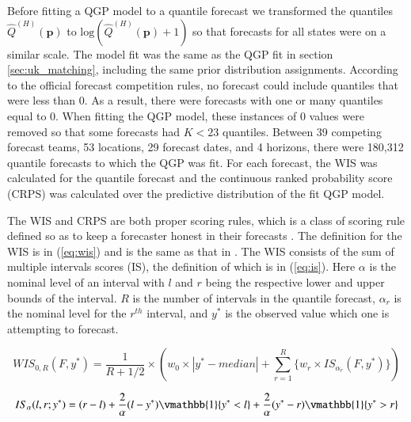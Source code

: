 \documentclass[preprint,12pt,authoryear]{elsarticle}
\begin{document}
Before fitting a QGP model to a quantile forecast we transformed the quantiles $\hat{Q}^{(H)}(\boldsymbol{p})$ to $\text{log}(\hat{Q}^{(H)}(\boldsymbol{p}) + 1)$ so that forecasts for all states were on a similar scale. The model fit was the same as the QGP fit in section \ref{sec:uk_matching}, including the same prior distribution assignments.
According to the official forecast competition rules, no forecast could include quantiles that were less than 0. As a result, there were forecasts with one or many quantiles equal to 0. When fitting the QGP model, these instances of 0 values were removed so that some forecasts had $K < 23$ quantiles. Between 39 competing forecast teams, 53 locations, 29 forecast dates, and 4 horizons, there were 180,312 quantile forecasts to which the QGP was fit. For each forecast, the WIS was calculated for the quantile forecast and the continuous ranked probability score (CRPS) was calculated over the predictive distribution of the fit QGP model.

The WIS and CRPS are both proper scoring rules, which is a class of scoring rule defined so as to keep a forecaster honest in their forecasts \cite[]{gneiting2007strictly, gneiting2014probabilistic}. 
The definition for the WIS is in (\ref{eq:wis}) and is the same as that in \cite{bracher2021evaluating}. The WIS consists of the sum of multiple intervals scores (IS), the definition of which is in (\ref{eq:is}). Here $\alpha$ is the nominal level of an interval with $l$ and $r$ being the respective lower and upper bounds of the interval. $R$ is the number of intervals in the quantile forecast, $\alpha_r$ is the nominal level for the $r^{th}$ interval, and $y^*$ is the observed value which one is attempting to forecast. 

\begin{equation}
\label{eq:wis}
        WIS_{0,R}(F, y^*) = \frac{1}{R + 1/2} \times (w_0\times |y^* - median| + \sum_{r=1}^R \{w_r \times IS_{\alpha_r}(F, y^*) \} )
\end{equation}

\begin{equation}
\label{eq:is}
        IS_{\alpha}(l,r;y^*) = (r-l) + \frac{2}{\alpha}(l - y^*)\vmathbb{1}\{y^* < l\} + \frac{2}{\alpha}(y^* - r) \vmathbb{1}\{y^* > r\}
\end{equation}
\end{document}
